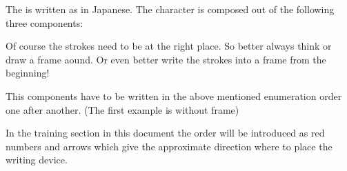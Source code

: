 The \textbf{\jtopic{}}  is written as  in Japanese.
The character is composed out of the following three components:

\bigskip
\bigskip
\bigskip

Of course the strokes need to be at the right place. So better always think or
draw a frame aound. Or even better write the strokes into a frame from the
beginning!

\bigskip
\bigskip
\bigskip


\bigskip

This components have to be written in the above mentioned enumeration order one
after another. (The first example is without frame)

\bigskip
\bigskip
\bigskip

%
%

\bigskip
\bigskip
\bigskip

\bigskip

In the \textbf{\jtopic{}} training section in this document the order will be
introduced as red numbers and arrows which give the approximate direction where
to place the writing device.


